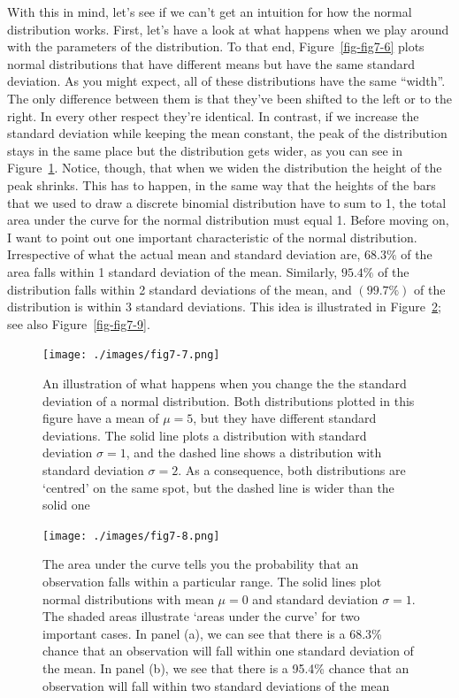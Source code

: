 \documentclass[
  letterpaper,
]{book}
\begin{document}
With this in mind, let's see if we can't get an intuition for how the
normal distribution works. First, let's have a look at what happens when
we play around with the parameters of the distribution. To that end,
Figure~\ref{fig-fig7-6} plots normal distributions that have different
means but have the same standard deviation. As you might expect, all of
these distributions have the same ``width''. The only difference between
them is that they've been shifted to the left or to the right. In every
other respect they're identical. In contrast, if we increase the
standard deviation while keeping the mean constant, the peak of the
distribution stays in the same place but the distribution gets wider, as
you can see in Figure~\ref{fig-fig7-7}. Notice, though, that when we
widen the distribution the height of the peak shrinks. This has to
happen, in the same way that the heights of the bars that we used to
draw a discrete binomial distribution have to sum to 1, the total area
under the curve for the normal distribution must equal 1. Before moving
on, I want to point out one important characteristic of the normal
distribution. Irrespective of what the actual mean and standard
deviation are, \(68.3\%\) of the area falls within 1 standard deviation
of the mean. Similarly, \(95.4\%\) of the distribution falls within 2
standard deviations of the mean, and \((99.7\%)\) of the distribution is
within 3 standard deviations. This idea is illustrated in
Figure~\ref{fig-fig7-8}; see also Figure~\ref{fig-fig7-9}.

\begin{figure}

\texttt{[image: ./images/fig7-7.png]} \hfill{}

\caption{\label{fig-fig7-7}An illustration of what happens when you
change the the standard deviation of a normal distribution. Both
distributions plotted in this figure have a mean of \(\mu = 5\), but
they have different standard deviations. The solid line plots a
distribution with standard deviation \(\sigma = 1\), and the dashed line
shows a distribution with standard deviation \(\sigma = 2\). As a
consequence, both distributions are `centred' on the same spot, but the
dashed line is wider than the solid one}

\end{figure}

\begin{figure}

\texttt{[image: ./images/fig7-8.png]} \hfill{}

\caption{\label{fig-fig7-8}The area under the curve tells you the
probability that an observation falls within a particular range. The
solid lines plot normal distributions with mean \(\mu = 0\) and standard
deviation \(\sigma = 1\). The shaded areas illustrate `areas under the
curve' for two important cases. In panel (a), we can see that there is a
68.3\% chance that an observation will fall within one standard
deviation of the mean. In panel (b), we see that there is a 95.4\%
chance that an observation will fall within two standard deviations of
the mean}

\end{figure}
\end{document}

